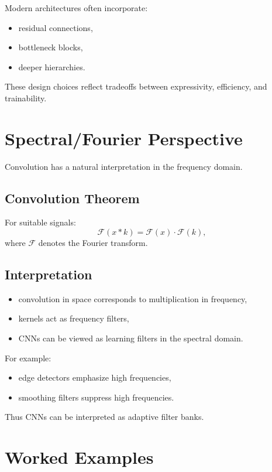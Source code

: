 Modern architectures often incorporate:
\begin{itemize}
    \item residual connections,
    \item bottleneck blocks,
    \item deeper hierarchies.
\end{itemize}

These design choices reflect tradeoffs between expressivity, efficiency, and trainability.

\section{Spectral/Fourier Perspective}

Convolution has a natural interpretation in the frequency domain.

\subsection{Convolution Theorem}

For suitable signals:
\[
\mathcal{F}(x * k) = \mathcal{F}(x) \cdot \mathcal{F}(k),
\]
where $\mathcal{F}$ denotes the Fourier transform.

\subsection{Interpretation}

\begin{itemize}
    \item convolution in space corresponds to multiplication in frequency,
    \item kernels act as frequency filters,
    \item CNNs can be viewed as learning filters in the spectral domain.
\end{itemize}

For example:
\begin{itemize}
    \item edge detectors emphasize high frequencies,
    \item smoothing filters suppress high frequencies.
\end{itemize}

Thus CNNs can be interpreted as adaptive filter banks.

\section{Worked Examples}

